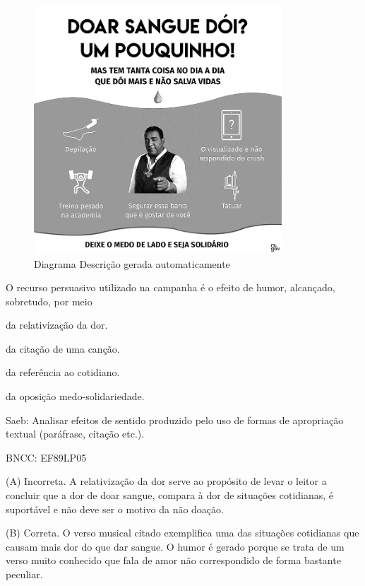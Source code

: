 \begin{figure}
\centering
\includegraphics[width=3.65556in,height=3.65556in]{./imgSAEB_8_POR/media/image38.png}
\caption{Diagrama Descrição gerada automaticamente}
\end{figure}


O recurso persuasivo utilizado na campanha é o efeito de humor,
alcançado, sobretudo, por meio

\begin{escolha}
\item da relativização da dor.
\item da citação de uma canção.
\item da referência ao cotidiano.
\item da oposição medo-solidariedade.
\end{escolha}

Saeb: Analisar efeitos de sentido produzido pelo uso de formas de
apropriação textual (paráfrase, citação etc.).

BNCC: EF89LP05

(A) Incorreta. A relativização da dor serve ao propósito de levar o
leitor a concluir que a dor de doar sangue, compara à dor de situações
cotidianas, é suportável e não deve ser o motivo da não doação.

(B) Correta. O verso musical citado exemplifica uma das situações
cotidianas que causam mais dor do que dar sangue. O humor é gerado
porque se trata de um verso muito conhecido que fala de amor não
correspondido de forma bastante peculiar.

